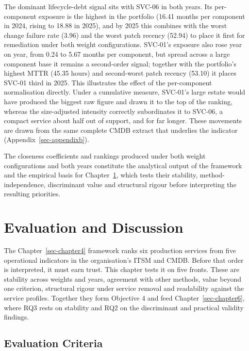 \documentclass[
  12pt,
  letterpaper,
  12pt,
  oneside,
  english,
  onehalfspacing,
  headsepline]{MastersDoctoralThesis}
\begin{document}
The dominant lifecycle-debt signal sits with SVC-06 in both years. Its
per-component exposure is the highest in the portfolio (16.41 months per
component in 2024, rising to 18.88 in 2025), and by 2025 this combines
with the worst change failure rate (3.96) and the worst patch recency
(52.94) to place it first for remediation under both weight
configurations. SVC-01's exposure also rose year on year, from 0.24 to
5.67 months per component, but spread across a large component base it
remains a second-order signal; together with the portfolio's highest
MTTR (45.35 hours) and second-worst patch recency (53.10) it places
SVC-01 third in 2025. This illustrates the effect of the per-component
normalisation directly. Under a cumulative measure, SVC-01's large
estate would have produced the biggest raw figure and drawn it to the
top of the ranking, whereas the size-adjusted intensity correctly
subordinates it to SVC-06, a compact service about half out of support,
and for far longer. These movements are drawn from the same complete
CMDB extract that underlies the indicator
(Appendix~\ref{sec-appendixb}).

The closeness coefficients and rankings produced under both weight
configurations and both years constitute the analytical output of the
framework and the empirical basis for Chapter~\ref{sec-chapter5}, which
tests their stability, method-independence, discriminant value and
structural rigour before interpreting the resulting priorities.


\chapter{Evaluation and Discussion}\label{sec-chapter5}

The Chapter~\ref{sec-chapter4} framework ranks six production services
from five operational indicators in the organisation's ITSM and CMDB.
Before that order is interpreted, it must earn trust. This chapter tests
it on five fronts. These are stability across weights and years,
agreement with other methods, value beyond one criterion, structural
rigour under service removal and readability against the service
profiles. Together they form Objective 4 and feed
Chapter~\ref{sec-chapter6}, where RQ3 rests on stability and RQ2 on the
discriminant and practical validity findings.

\section{Evaluation Criteria}\label{sec-evaluationcriteria}
\end{document}

